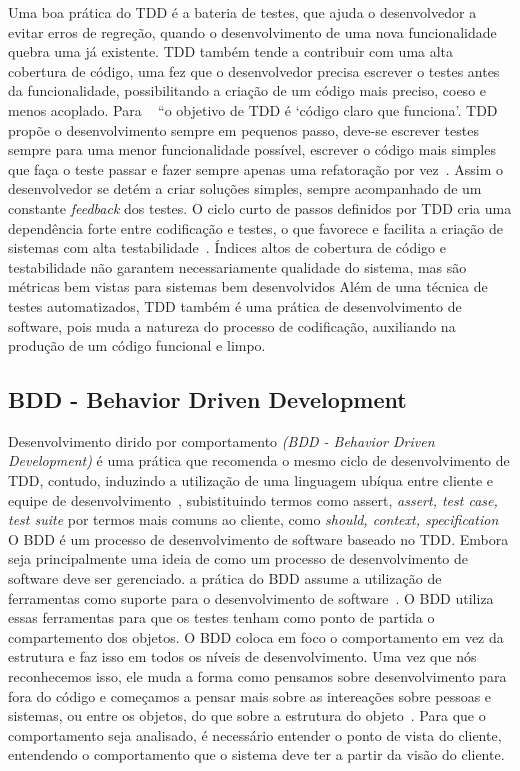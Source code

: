 Uma boa prática do TDD é a bateria de testes, que ajuda o desenvolvedor a evitar 
erros de regreção, quando o desenvolvimento de uma nova funcionalidade quebra uma 
já existente. TDD também tende a contribuir com uma alta cobertura de código, uma 
fez que o desenvolvedor precisa escrever o testes antes da funcionalidade, 
possibilitando a criação de um código mais preciso, coeso e menos acoplado. 
%
Para ~ “o objetivo de TDD é ‘código claro que 
funciona’.
%
TDD propõe o desenvolvimento sempre em pequenos passo, deve-se escrever testes sempre 
para uma menor funcionalidade possível, escrever o código mais simples que faça o 
teste passar e fazer sempre apenas uma refatoração por vez~. Assim o 
desenvolvedor se detém a criar soluções simples, sempre acompanhado de um constante 
\textit{feedback} dos testes.
%
O ciclo curto de passos definidos por TDD cria uma dependência forte entre codificação 
e testes, o que favorece e facilita a criação de sistemas com alta testabilidade~. 
Índices altos de cobertura de código e testabilidade não garantem necessariamente 
qualidade do sistema, mas são métricas bem vistas para sistemas bem desenvolvidos
%
Além de uma técnica de testes automatizados, TDD também é uma prática de desenvolvimento 
de software, pois muda a natureza do processo de codificação, auxiliando na produção 
de um código funcional e limpo.
%

\subsection{BDD - Behavior Driven Development}
Desenvolvimento dirido por comportamento \textit{(BDD - Behavior Driven Development)} 
é uma prática que recomenda o mesmo ciclo de desenvolvimento de TDD, contudo, induzindo 
a utilização de uma linguagem ubíqua entre cliente e equipe de desenvolvimento~, subistituindo termos como assert, \textit{assert, test case, test suite} por termos 
mais comuns ao cliente, como \textit{should, context, specification}
%
O BDD é um processo de desenvolvimento de software baseado no TDD. Embora seja 
principalmente uma ideia de como um processo de desenvolvimento de 
software deve ser gerenciado. a prática do BDD assume a utilização de ferramentas 
como suporte para o desenvolvimento de software~. O BDD utiliza 
essas ferramentas para que os testes tenham como ponto de partida o compartemento 
dos objetos.
%
O BDD coloca em foco o comportamento em vez da estrutura e faz isso em todos os 
níveis de desenvolvimento. Uma vez que nós reconhecemos isso, ele muda a forma 
como pensamos sobre desenvolvimento para fora do código e começamos a pensar mais 
sobre as intereações sobre pessoas e sistemas, ou entre os objetos, do que sobre a 
estrutura do objeto~\cite{chelimsky2010}.
%
Para que o comportamento seja analisado, é necessário entender o ponto de vista do 
cliente, entendendo o comportamento que o sistema deve ter a partir da visão do cliente. 
%
